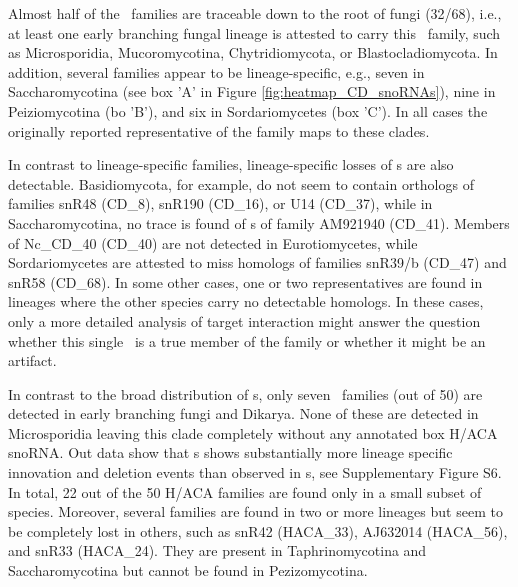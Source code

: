 Almost half of the \cd\ families are traceable down to the root of
fungi (32/68), i.e., at least one early branching fungal lineage is
attested to carry this \sno\ family, such as Microsporidia,
Mucoromycotina, Chytridiomycota, or Blastocladiomycota. In addition,
several families appear to be lineage-specific, e.g., seven in
Saccharomycotina (see box 'A' in Figure \ref{fig:heatmap_CD_snoRNAs}),
nine in Peiziomycotina (bo 'B'), and six in Sordariomycetes (box
'C'). In all cases the originally reported representative of the family 
maps to these clades. 

In contrast to lineage-specific families, lineage-specific losses of \sno s
are also detectable. Basidiomycota, for example, do not seem to contain
orthologs of families snR48 (CD\_8), snR190 (CD\_16), or U14 (CD\_37),
while in Saccharomycotina, no trace is found of \sno s of family AM921940
(CD\_41). Members of Nc\_CD\_40 (CD\_40) are not detected in
Eurotiomycetes, while Sordariomycetes are attested to miss homologs of
families snR39/b (CD\_47) and snR58 (CD\_68). In some other cases, one or
two representatives are found in lineages where the other species carry no
detectable homologs. In these cases, only a more detailed analysis of
target interaction might answer the question whether this single \sno\ is a
true member of the family or whether it might be an artifact.

In contrast to the broad distribution of \cd s, only seven \haca\ families
(out of 50) are detected in early branching fungi and Dikarya. None of
these are detected in Microsporidia leaving this clade completely without
any annotated box H/ACA snoRNA. Out data show that \haca s shows
substantially more lineage specific innovation and deletion events than
observed in \cd s, see Supplementary Figure S6. In total, 22 out of the 50
H/ACA families are found only in a small subset of species. Moreover,
several families are found in two or more lineages but seem to be
completely lost in others, such as snR42 (HACA\_33), AJ632014 (HACA\_56),
and snR33 (HACA\_24). They are present in Taphrinomycotina and
Saccharomycotina but cannot be found in Pezizomycotina.

